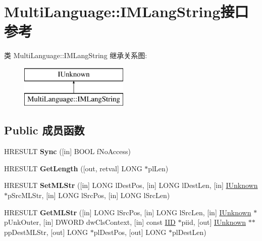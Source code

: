 \hypertarget{interface_multi_language_1_1_i_m_lang_string}{}\section{Multi\+Language\+:\+:I\+M\+Lang\+String接口 参考}
\label{interface_multi_language_1_1_i_m_lang_string}
类 Multi\+Language\+:\+:I\+M\+Lang\+String 继承关系图\+:\begin{figure}[H]
\begin{center}
\leavevmode
\includegraphics[height=2.000000cm]{interface_multi_language_1_1_i_m_lang_string}
\end{center}
\end{figure}
\subsection*{Public 成员函数}
\begin{DoxyCompactItemize}
\item 
\mbox{\label{interface_multi_language_1_1_i_m_lang_string_a8aab122c5884230c540864d6f2af5669}} 
H\+R\+E\+S\+U\+LT {\bfseries Sync} (\mbox{[}in\mbox{]} B\+O\+OL f\+No\+Access)
\item 
\mbox{\label{interface_multi_language_1_1_i_m_lang_string_abc7558a181d6537f32869fd415b03767}} 
H\+R\+E\+S\+U\+LT {\bfseries Get\+Length} (\mbox{[}out, retval\mbox{]} L\+O\+NG $\ast$pl\+Len)
\item 
\mbox{\label{interface_multi_language_1_1_i_m_lang_string_ae004de8941846df9e479ae9736717d7e}} 
H\+R\+E\+S\+U\+LT {\bfseries Set\+M\+L\+Str} (\mbox{[}in\mbox{]} L\+O\+NG l\+Dest\+Pos, \mbox{[}in\mbox{]} L\+O\+NG l\+Dest\+Len, \mbox{[}in\mbox{]} \hyperlink{interface_i_unknown}{I\+Unknown} $\ast$p\+Src\+M\+L\+Str, \mbox{[}in\mbox{]} L\+O\+NG l\+Src\+Pos, \mbox{[}in\mbox{]} L\+O\+NG l\+Src\+Len)
\item 
\mbox{\label{interface_multi_language_1_1_i_m_lang_string_a2c8b59e738f5f8acb1b19194020c21d5}} 
H\+R\+E\+S\+U\+LT {\bfseries Get\+M\+L\+Str} (\mbox{[}in\mbox{]} L\+O\+NG l\+Src\+Pos, \mbox{[}in\mbox{]} L\+O\+NG l\+Src\+Len, \mbox{[}in\mbox{]} \hyperlink{interface_i_unknown}{I\+Unknown} $\ast$p\+Unk\+Outer, \mbox{[}in\mbox{]} D\+W\+O\+RD dw\+Cls\+Context, \mbox{[}in\mbox{]} const \hyperlink{struct___i_i_d}{I\+ID} $\ast$piid, \mbox{[}out\mbox{]} \hyperlink{interface_i_unknown}{I\+Unknown} $\ast$$\ast$pp\+Dest\+M\+L\+Str, \mbox{[}out\mbox{]} L\+O\+NG $\ast$pl\+Dest\+Pos, \mbox{[}out\mbox{]} L\+O\+NG $\ast$pl\+Dest\+Len)
\end{DoxyCompactItemize}
